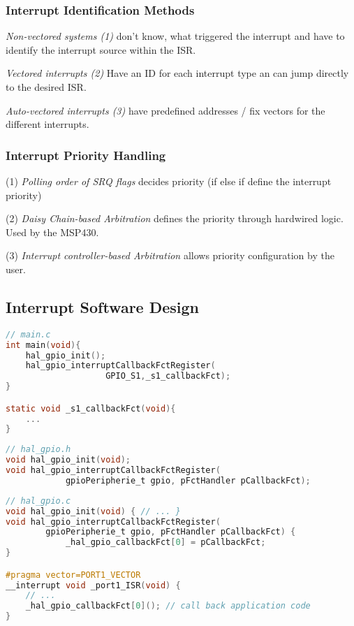 \subsubsection{Interrupt Identification Methods }
\textit{Non-vectored systems (1)} don't know, what triggered the interrupt and have to identify the interrupt source within the ISR.

\textit{Vectored interrupts (2)} Have an ID for each interrupt type an can jump directly to the desired ISR.

\textit{Auto-vectored interrupts (3)} have predefined addresses / fix vectors for the different interrupts.

\subsubsection{Interrupt Priority Handling }
(1) \textit{Polling order of SRQ flags} decides priority (if else if define the interrupt priority)

(2) \textit{Daisy Chain-based Arbitration} defines the priority through hardwired logic. Used by the MSP430.

(3) \textit{Interrupt controller-based Arbitration} allows priority configuration by the user.

\subsection{Interrupt Software Design }
\begin{lstlisting}[language=c]
// main.c
int main(void){
	hal_gpio_init();
	hal_gpio_interruptCallbackFctRegister(
					GPIO_S1,_s1_callbackFct);
}

static void _s1_callbackFct(void){
	...
}
\end{lstlisting}\vspace{-20px}
\begin{lstlisting}[language=c]
// hal_gpio.h
void hal_gpio_init(void);
void hal_gpio_interruptCallbackFctRegister(
			gpioPeripherie_t gpio, pFctHandler pCallbackFct);
\end{lstlisting}\vspace{-20px}
\begin{lstlisting}[language=c]
// hal_gpio.c
void hal_gpio_init(void) { // ... }
void hal_gpio_interruptCallbackFctRegister(
		gpioPeripherie_t gpio, pFctHandler pCallbackFct) {
			_hal_gpio_callbackFct[0] = pCallbackFct;
}

#pragma vector=PORT1_VECTOR
__interrupt void _port1_ISR(void) {
	// ...
	_hal_gpio_callbackFct[0](); // call back application code
}
\end{lstlisting}\vspace{-20px}



